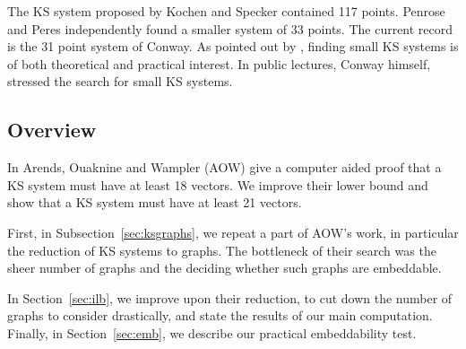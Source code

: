 \documentclass[a4paper]{article}
\newcounter{main}
\theoremstyle{definition}
\theoremstyle{remark}
\begin{document}
The KS system proposed by Kochen and Specker contained 117 points\cite{ks}.
Penrose and Peres\cite{peres} independently found a smaller system of 33 points.
The current record is the 31 point system of Conway\cite[p.~197]{qtcm}.
As pointed out by \cite{c00,aow11}, finding small KS systems
is of both theoretical and practical interest.
In public lectures, Conway himself, stressed the search for small KS systems.

\subsection{Overview}
In \cite{aow11} Arends, Ouaknine and Wampler (AOW) give a computer aided proof
that a KS system must have at least 18 vectors.  We improve their lower bound
and show that a KS system must have at least 21 vectors.

First, in Subsection~\ref{sec:ksgraphs},
we repeat a part of AOW's work, in particular the reduction of
KS systems to graphs.
The bottleneck of their search was the sheer number of graphs
and the deciding whether such graphs are embeddable.

In Section~\ref{sec:ilb},
we improve upon their reduction,
to cut down the number of graphs to consider drastically,
and state the results of our main computation.
Finally, in Section~\ref{sec:emb},
we describe our practical embeddability test.
\end{document}
